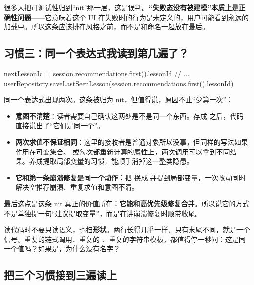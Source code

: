 \begin{keypoint}[可测试性不是风格问题]
很多人把可测试性归到“nit”那一层，这是误判。\textbf{“失败态没有被建模”本质上是正确性问题}——它意味着这个 UI 在失败时的行为是未定义的，用户可能看到永远的加载中。所以这条应该排在风格之前，而不是和命名一起放在最后。
\end{keypoint}

\subsection{习惯三：同一个表达式我读到第几遍了？}

\begin{kotlin}
nextLessonId = session.recommendations.first().lessonId
// ...
userRepository.saveLastSeenLesson(session.recommendations.first().lessonId)
\end{kotlin}

同一个表达式出现两次。这条被归为 nit，但值得说，原因不止“少算一次”：

\begin{itemize}
  \item \textbf{意图不清楚}：读者需要自己确认这两处是不是同一个东西。存成  之后，代码直接说出了“它们是同一个”。
  \item \textbf{两次求值不保证相同}：这里的接收者是普通对象所以没事，但同样的写法如果作用在可变集合、 或每次都重新计算的属性上，两次调用可以拿到不同结果。养成提取局部变量的习惯，能顺手消掉这一整类隐患。
  \item \textbf{它和第一条崩溃修复是同一个动作}：把  换成  并提到局部变量，一次改动同时解决空推荐崩溃、重复求值和意图不清。
\end{itemize}

最后这点是这条 nit 真正的价值所在：\textbf{它能和高优先级修复合并}。所以说它的方式不是单独提一句“建议提取变量”，而是在讲崩溃修复时顺带收尾。

\begin{idea}
读代码时不要只读语义，也扫\textbf{形状}。两行长得几乎一样、只有末尾不同，就是一个信号。重复的链式调用、重复的 、重复的字符串模板，都值得停一秒问：这是同一个值吗？如果是，为什么没有名字？
\end{idea}

\subsection{把三个习惯接到三遍读上}

